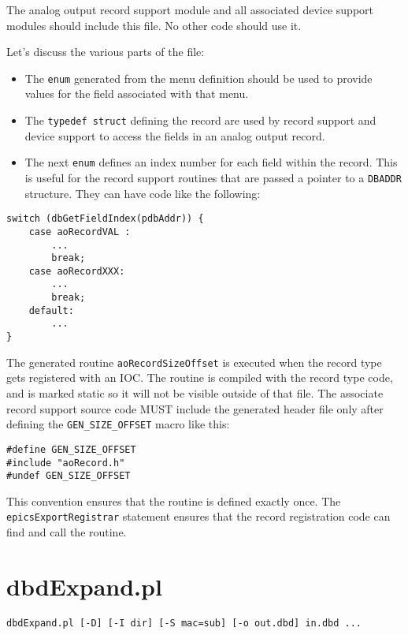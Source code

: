 The analog output record support module and all associated device support modules should include this file.
No other code should use it.

Let's discuss the various parts of the file:

\begin{itemize}
\item The \verb|enum| generated from the menu definition should be used to provide values for the field associated with that menu.

\item The \verb|typedef struct| defining the record are used by record support and device support to access the fields in an analog output record.

\item The next \verb|enum| defines an index number for each field within the record.
This is useful for the record support routines that are passed a pointer to a \verb|DBADDR| structure.
They can have code like the following:

\end{itemize}

\begin{verbatim}
switch (dbGetFieldIndex(pdbAddr)) {
    case aoRecordVAL :
        ...
        break;
    case aoRecordXXX:
        ...
        break;
    default:
        ...
}
\end{verbatim}

The generated routine \verb|aoRecordSizeOffset| is executed when the record type gets registered with an IOC.
The routine is compiled with the record type code, and is marked static so it will not be visible outside of that file.
The associate record support source code MUST include the generated header file only after defining the \verb|GEN_SIZE_OFFSET| macro like this:

\begin{verbatim}
#define GEN_SIZE_OFFSET
#include "aoRecord.h"
#undef GEN_SIZE_OFFSET
\end{verbatim}

This convention ensures that the routine is defined exactly once.
The \verb|epicsExportRegistrar| statement ensures that the record registration code can find and call the routine.

\section{dbdExpand.pl}

\begin{verbatim}
dbdExpand.pl [-D] [-I dir] [-S mac=sub] [-o out.dbd] in.dbd ...
\end{verbatim}

